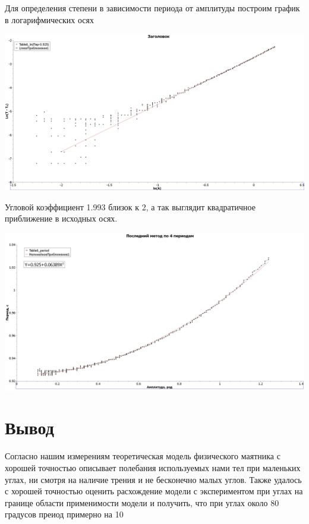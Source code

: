 \documentclass[12pt,a4paper]{scrartcl}
\begin{document}
Для определения степени в зависимости периода от амплитуды построим график в логарифмических осях
\begin{flushleft}
\includegraphics[scale=0.45]{Ln}
\end{flushleft}
Угловой коэффициент 1.993 близок к 2, а так выглядит квадратичное приближение в исходных осях.
\begin{flushleft}
\includegraphics[scale=0.45]{T(A)}
\end{flushleft}

\section{Вывод}
Согласно нашим измерениям теоретическая модель физического маятника с хорошей точностью описывает полебания используемых нами тел при маленьких углах, ни смотря на наличие трения и не бесконечно малых углов. Также удалось с хорошей точностью оценить расхождение модели с экспериментом при углах на границе области применимости модели и получить, что при углах около 80 градусов преиод примерно на 10 %
\end{document}
